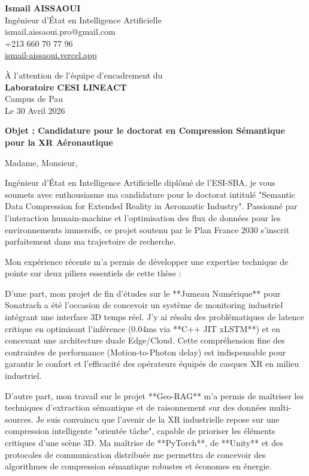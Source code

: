 \documentclass[a4paper,12pt]{article}
\begin{document}
\begin{flushleft}
    \textbf{Ismail AISSAOUI} \\
    Ingénieur d'État en Intelligence Artificielle \\
    ismail.aissaoui.pro@gmail.com \\
    +213 660 70 77 96 \\
    \href{https://ismail-aissaoui.vercel.app}{ismail-aissaoui.vercel.app}
\end{flushleft}

\begin{flushright}
    À l'attention de l'équipe d'encadrement du \\
    \textbf{Laboratoire CESI LINEACT} \\
    Campus de Pau \\
    \medskip
    Le 30 Avril 2026
\end{flushright}

\bigskip

\noindent \textbf{Objet : Candidature pour le doctorat en Compression Sémantique pour la XR Aéronautique}

\bigskip

Madame, Monsieur,

Ingénieur d'État en Intelligence Artificielle diplômé de l'ESI-SBA, je vous soumets avec enthousiasme ma candidature pour le doctorat intitulé "Semantic Data Compression for Extended Reality in Aeronautic Industry". Passionné par l'interaction humain-machine et l'optimisation des flux de données pour les environnements immersifs, ce projet soutenu par le Plan France 2030 s'inscrit parfaitement dans ma trajectoire de recherche.

Mon expérience récente m'a permis de développer une expertise technique de pointe sur deux piliers essentiels de cette thèse :

D'une part, mon projet de fin d'études sur le **Jumeau Numérique** pour Sonatrach a été l'occasion de concevoir un système de monitoring industriel intégrant une interface 3D temps réel. J'y ai résolu des problématiques de latence critique en optimisant l'inférence (0.04ms via **C++ JIT xLSTM**) et en concevant une architecture duale Edge/Cloud. Cette compréhension fine des contraintes de performance (Motion-to-Photon delay) est indispensable pour garantir le confort et l'efficacité des opérateurs équipés de casques XR en milieu industriel.

D'autre part, mon travail sur le projet **Geo-RAG** m'a permis de maîtriser les techniques d'extraction sémantique et de raisonnement sur des données multi-sources. Je suis convaincu que l'avenir de la XR industrielle repose sur une compression intelligente "orientée tâche", capable de prioriser les éléments critiques d'une scène 3D. Ma maîtrise de **PyTorch**, de **Unity** et des protocoles de communication distribuée me permettra de concevoir des algorithmes de compression sémantique robustes et économes en énergie.
\end{document}
